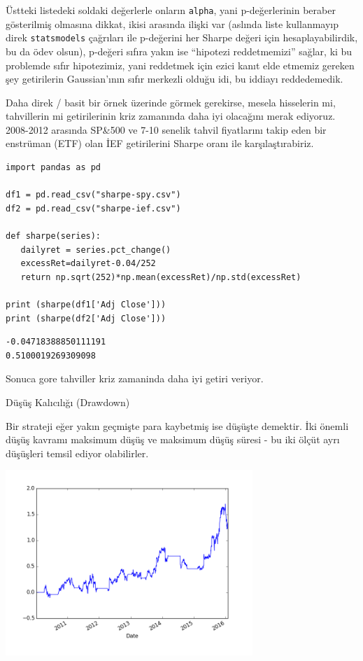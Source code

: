 \documentclass[12pt,fleqn]{article}\usepackage{../../common}
\begin{document}
Üstteki listedeki soldaki değerlerle onların \verb!alpha!, yani
p-değerlerinin beraber gösterilmiş olmasına dikkat, ikisi arasında ilişki
var (aslında liste kullanmayıp direk \verb!statsmodels! çağrıları ile
p-değerini her Sharpe değeri için hesaplayabilirdik, bu da ödev olsun),
p-değeri sıfıra yakın ise ``hipotezi reddetmemizi'' sağlar, ki bu problemde
sıfır hipotezimiz, yani reddetmek için ezici kanıt elde etmemiz gereken
şey getirilerin Gaussian'ının sıfır merkezli olduğu idi, bu iddiayı
reddedemedik.

Daha direk / basit bir örnek üzerinde görmek gerekirse, mesela hisselerin
mi, tahvillerin mi getirilerinin kriz zamanında daha iyi olacağını merak
ediyoruz. 2008-2012 arasında SP\&500 ve 7-10 senelik tahvil fiyatlarını
takip eden bir enstrüman (ETF) olan İEF getirilerini Sharpe oranı
ile karşılaştırabiriz.

\begin{verbatim}
import pandas as pd

df1 = pd.read_csv("sharpe-spy.csv")
df2 = pd.read_csv("sharpe-ief.csv")

def sharpe(series):
   dailyret = series.pct_change()
   excessRet=dailyret-0.04/252
   return np.sqrt(252)*np.mean(excessRet)/np.std(excessRet)

print (sharpe(df1['Adj Close']))
print (sharpe(df2['Adj Close']))
\end{verbatim}

\begin{verbatim}
-0.04718388850111191
0.5100019269309098
\end{verbatim}

Sonuca gore tahviller kriz zamaninda daha iyi getiri veriyor.

Düşüş Kalıcılığı (Drawdown)

Bir strateji eğer yakın geçmişte para kaybetmiş ise düşüşte demektir. İki
önemli düşüş kavramı maksimum düşüş ve maksimum düşüş süresi - bu iki ölçüt
ayrı düşüşleri temsil ediyor olabilirler.

\includegraphics[height=7cm]{tser_back_02.png}
\end{document}
